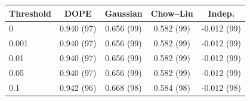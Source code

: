 \begin{tabular}{@{}lcccc@{}}
\toprule
Threshold & DOPE & Gaussian & Chow--Liu & Indep. \\
\midrule
0 & 0.940 (97) & 0.656 (99) & 0.582 (99) & -0.012 (99) \\
0.001 & 0.940 (97) & 0.656 (99) & 0.582 (99) & -0.012 (99) \\
0.01 & 0.940 (97) & 0.656 (99) & 0.582 (99) & -0.012 (99) \\
0.05 & 0.940 (97) & 0.656 (99) & 0.582 (99) & -0.012 (99) \\
0.1 & 0.942 (96) & 0.668 (98) & 0.584 (98) & -0.012 (98) \\
\bottomrule
\end{tabular}
